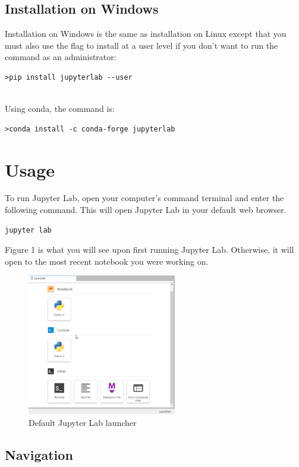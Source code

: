 \documentclass[pdftex,12pt]{artikel3}
\begin{document}
\subsection{Installation on Windows}
Installation on Windows is the same as installation on Linux except that you must also use the flag to install at a user level if you don't want to run the command as an administrator:
\begin{lstlisting}
>pip install jupyterlab --user
\end{lstlisting}

\\
Using conda, the command is:
\begin{lstlisting}
>conda install -c conda-forge jupyterlab
\end{lstlisting}


\section{Usage}

To run Jupyter Lab, open your computer's command terminal and enter the following command. This will open Jupyter Lab in your default web browser.

\begin{lstlisting}
jupyter lab
\end{lstlisting}

Figure 1 is what you will see upon first running Jupyter Lab. Otherwise, it will open to the most recent notebook you were working on.

\begin{figure}[h!]
    \centering
    \includegraphics[width=65mm]{launcher.png}
    \caption{Default Jupyter Lab launcher}
    \label{fig:jupyterlablauncher}
\end{figure}

\subsection{Navigation}
\end{document}
